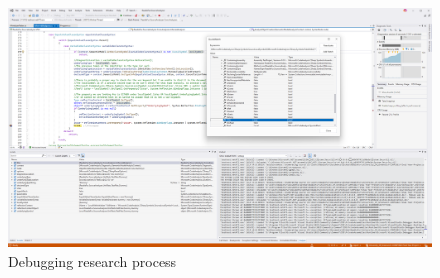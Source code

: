\begin{figure}[H]
    \centering
    \caption{Debugging research process}
    \label{fig:DebuggingResearchProcess}
    \includegraphics[width=1.0\textwidth]{Figures/DebuggingResearchProcess.png}
\end{figure}
